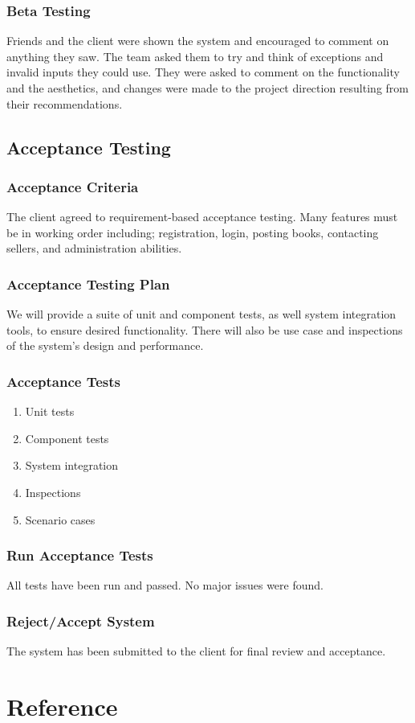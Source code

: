\documentclass[11pt]{article}
\begin{document}
		\subsubsection{Beta Testing}

			Friends and the client were shown the system and encouraged to comment on anything they saw. 
			The team asked them to try and think of exceptions and invalid inputs they could use. 
			They were asked to comment on the functionality and the aesthetics, and changes were made to the project direction resulting from their recommendations.

	\subsection{Acceptance Testing}

		\subsubsection{Acceptance Criteria}

			The client agreed to requirement-based acceptance testing. 
			Many features must be in working order including; registration, login, posting books, contacting sellers, and administration abilities.

		\subsubsection{Acceptance Testing Plan}

			We will provide a suite of unit and component tests, as well system integration tools, to ensure desired functionality. 
			There will also be use case and inspections of the system's design and performance.

		\subsubsection{Acceptance Tests}
			\begin{enumerate}
				\item Unit tests
				\item Component tests
				\item System integration
				\item Inspections
				\item Scenario cases
			\end{enumerate}

		\subsubsection{Run Acceptance Tests}
			All tests have been run and passed. No major issues were found.

		\subsubsection{Reject/Accept System}
			The system has been submitted to the client for final review and acceptance.
\section{Reference}
\end{document}
